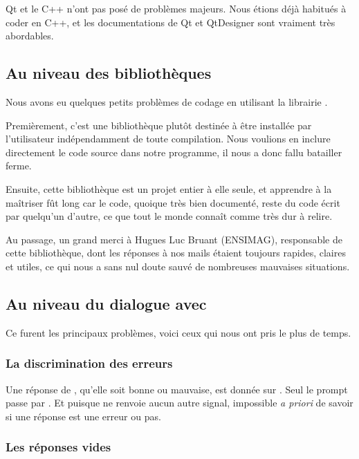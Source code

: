 		Qt et le C++ n'ont pas posé de problèmes majeurs. Nous étions déjà habitués à coder en C++, et les documentations de Qt et QtDesigner sont vraiment très abordables.
        
    \subsection{Au niveau des bibliothèques}
    
        Nous avons eu quelques petits problèmes de codage en utilisant la librairie \qcodeedit.

        Premièrement, c'est une bibliothèque plutôt destinée à être installée par l'utilisateur indépendamment de toute compilation.
        Nous voulions en inclure directement le code source dans notre programme, il nous a donc fallu batailler ferme.
        
        Ensuite, cette bibliothèque est un projet entier à elle seule, et apprendre à la maîtriser fût long car le code, quoique très bien documenté, reste du code écrit par quelqu'un d'autre, ce que tout le monde connaît comme très dur à relire.

        Au passage, un grand merci à Hugues Luc Bruant (ENSIMAG), responsable de cette bibliothèque, dont les réponses à nos mails étaient toujours rapides, claires et utiles, ce qui nous a sans nul doute sauvé de nombreuses mauvaises situations.
		
    \subsection{Au niveau du dialogue avec \coq}
    
        Ce furent les principaux problèmes, voici ceux qui nous ont pris le plus de temps.

        \subsubsection{La discrimination des erreurs}

        	Une réponse de \coqtop, qu'elle soit bonne ou mauvaise, est donnée sur \stdout. Seul le prompt passe par \stderr.
        	Et puisque \coqtop ne renvoie aucun autre signal, impossible \textit{a priori} de savoir si une réponse est une erreur ou pas.

        \subsubsection{Les réponses vides}

